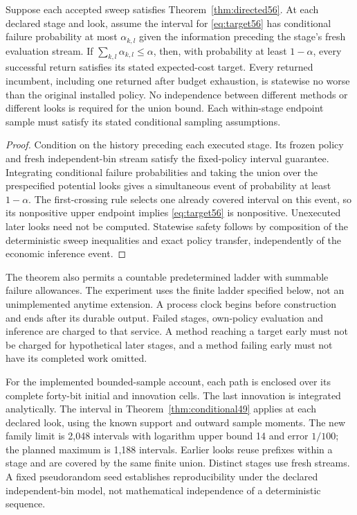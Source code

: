 \begin{theorem}\label{thm:stop56}
Suppose each accepted sweep satisfies Theorem~\ref{thm:directed56}. At each declared stage and look, assume the interval for \eqref{eq:target56} has conditional failure probability at most $\alpha_{k,l}$ given the information preceding the stage's fresh evaluation stream. If $\sum_{k,l}\alpha_{k,l}\le\alpha$, then, with probability at least $1-\alpha$, every successful return satisfies its stated expected-cost target. Every returned incumbent, including one returned after budget exhaustion, is statewise no worse than the original installed policy. No independence between different methods or different looks is required for the union bound. Each within-stage endpoint sample must satisfy its stated conditional sampling assumptions.
\end{theorem}
\begin{proof}
Condition on the history preceding each executed stage. Its frozen policy and fresh independent-bin stream satisfy the fixed-policy interval guarantee. Integrating conditional failure probabilities and taking the union over the prespecified potential looks gives a simultaneous event of probability at least $1-\alpha$. The first-crossing rule selects one already covered interval on this event, so its nonpositive upper endpoint implies \eqref{eq:target56} is nonpositive. Unexecuted later looks need not be computed. Statewise safety follows by composition of the deterministic sweep inequalities and exact policy transfer, independently of the economic inference event.
\end{proof}

The theorem also permits a countable predetermined ladder with summable failure allowances. The experiment uses the finite ladder specified below, not an unimplemented anytime extension. A process clock begins before construction and ends after its durable output. Failed stages, own-policy evaluation and inference are charged to that service. A method reaching a target early must not be charged for hypothetical later stages, and a method failing early must not have its completed work omitted.

For the implemented bounded-sample account, each path is enclosed over its complete forty-bit initial and innovation cells. The last innovation is integrated analytically. The interval in Theorem~\ref{thm:conditional49} applies at each declared look, using the known support and outward sample moments. The new family limit is 2,048 intervals with logarithm upper bound 14 and error $1/100$; the planned maximum is 1,188 intervals. Earlier looks reuse prefixes within a stage and are covered by the same finite union. Distinct stages use fresh streams. A fixed pseudorandom seed establishes reproducibility under the declared independent-bin model, not mathematical independence of a deterministic sequence.

